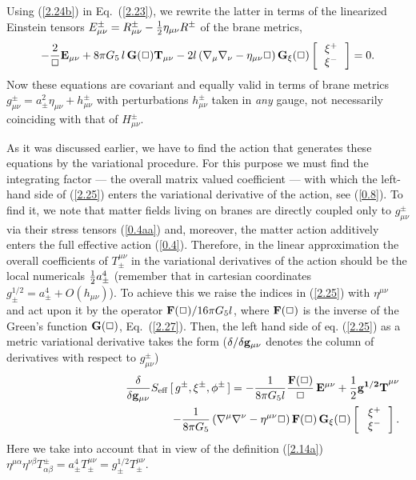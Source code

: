 \documentclass[a4paper,preprint,nofootinbib,
                 showpacs,preprintnumbers,amsmath,amssymb]{revtex4}
\begin{document}
Using (\ref{2.24b}) in Eq.~(\ref{2.23}), we rewrite the latter in 
terms of the linearized Einstein tensors 
$E_{\mu\nu}^\pm=R_{\mu\nu}^\pm-{1\over2}\eta_{\mu\nu}R^\pm$ of the 
brane metrics, 
    \begin{equation} 
    -\frac2\Box {\bf E}_{\mu\nu} 
    +8\pi G_5\, l\,{\bf G}(\Box) 
    {\bf T}_{\mu \nu} 
   -2l\,(\nabla_\mu\nabla_\nu-\eta_{\mu\nu}\Box)\,{\bf G_\xi}(\Box) 
   \left[\begin{array}{c} 
      \,\xi^+\, \\ \,\xi^-\, 
      \end{array}\right]=0. \label{2.25} 
    \end{equation} 
Now these equations are covariant and equally valid in terms of 
brane metrics $g^\pm_{\mu\nu}=a_\pm^2\eta_{\mu\nu}+h^\pm_{\mu\nu}$ 
with perturbations $h^\pm_{\mu\nu}$ taken in {\em any} gauge, not 
necessarily coinciding with that of $H^\pm_{\mu\nu}$. 
 
As it was discussed earlier, we have to find the action that 
generates these equations by the variational procedure. For this 
purpose we must find the integrating factor --- the overall matrix 
valued coefficient --- with which the left-hand side of 
(\ref{2.25}) enters the variational derivative of the action, see 
(\ref{0.8}). To find it, we note that matter fields living on 
branes are directly coupled only to 
$g^\pm_{\mu\nu}$ via their stress tensors (\ref{0.4aa}) and, 
moreover, the matter action additively enters the full effective 
action (\ref{0.4}). Therefore, in the linear approximation the 
overall coefficients of $T^{\mu\nu}_\pm$ in the variational 
derivatives of the action should be the local numericals 
${1\over2}a_\pm^4$ (remember that in cartesian 
coordinates $g_\pm^{1/2}=a_\pm^4+O(h_{\mu\nu})$). To 
achieve this we raise the indices in (\ref{2.25}) with 
$\eta^{\mu\nu}$ and act upon it by the operator ${\bf 
F}(\Box)/16\pi G_5l$, where ${\bf F}(\Box)$ is the 
inverse of the Green's function ${\bf G}(\Box)$, Eq.~(\ref{2.27}). 
Then, the left hand side of eq. (\ref{2.25}) as a metric 
variational derivative takes the form (${\bf \delta/\delta 
g_{\mu\nu}}$ denotes the column of derivatives with respect to 
$g^\pm_{\mu\nu}$) 
    \begin{eqnarray} 
    &&{\bf \frac\delta{\delta g_{\mu\nu}}} 
    S_{\rm eff}\,[\,g^\pm,\xi^\pm,\phi^\pm\,]= 
    -\frac1{8\pi G_5l} 
    \frac{{\bf F}(\Box)}{\Box}\, 
    {\bf E}^{\mu\nu}+\frac12 
    {\bf g^{1/2}T}^{\mu \nu}           \nonumber\\ 
    &&\qquad\qquad\qquad\qquad\qquad\qquad\quad-\frac1{8\pi G_5}\, 
    (\nabla^\mu\nabla^\nu-\eta^{\mu\nu}\Box)\, 
    {\bf F}(\Box)\,{\bf G_\xi}(\Box) 
    \left[\begin{array}{c} 
      \,\,\xi^+\, \\ \,\,\xi^-\, \end{array}\right].    \label{2.28} 
    \end{eqnarray} 
Here we take into account that in view of the 
definition (\ref{2.14a}) $\eta^{\mu\alpha}\eta^{\nu\beta} 
T_{\alpha\beta}^\pm=a_\pm^4T^{\mu\nu}_\pm=g^{1/2}_\pm T^{\mu\nu}_\pm$. 
 
\end{document}
